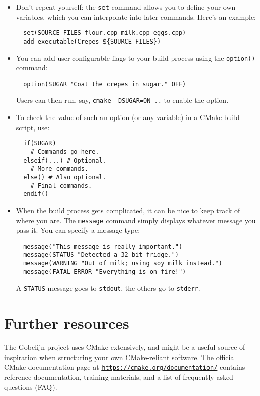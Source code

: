 \documentclass[12pt,a4paper]{article}
\newcommand{\cod}[1]{{\color{red!60!black}\texttt{#1}}}
\begin{document}
  \begin{itemize}
    \item Don't repeat yourself: the \cod{set} command allows you to define 
    your own variables, which you can interpolate into later commands. 
    Here's an example:
  \begin{lstlisting}
  set(SOURCE_FILES flour.cpp milk.cpp eggs.cpp)
  add_executable(Crepes ${SOURCE_FILES})
  \end{lstlisting}
    \item You can add user-configurable flags to your build process using the 
    \cod{option()} command:
  \begin{lstlisting}
  option(SUGAR "Coat the crepes in sugar." OFF)
  \end{lstlisting}
    Users can then run, say, \cod{cmake -DSUGAR=ON ..} to enable the option.
    
    \item To check the value of such an option (or any variable) in a CMake 
    build script, use:
  \begin{lstlisting}
  if(SUGAR)
    # Commands go here.
  elseif(...) # Optional.
    # More commands.
  else() # Also optional.
    # Final commands.
  endif()
  \end{lstlisting}
  \pagebreak
  
  \item When the build process gets complicated, it can be nice to keep track 
  of where you are. The \cod{message} command simply displays whatever message 
  you 
  pass it. You can specify a message type:
  \begin{lstlisting}
  message("This message is really important.")
  message(STATUS "Detected a 32-bit fridge.")
  message(WARNING "Out of milk; using soy milk instead.")
  message(FATAL_ERROR "Everything is on fire!")
  \end{lstlisting}
  A \cod{STATUS} message goes to \cod{stdout}, the others go to 
  \cod{stderr}.  
  \end{itemize}
  \section{Further resources}
  The Gobelijn project uses CMake extensively, and might be a useful source of 
  inspiration when structuring your own CMake-reliant software. The official 
  CMake documentation page at 
  \href{https://cmake.org/documentation/}{\cod{https://cmake.org/documentation/}}
  contains reference documentation, training materials, and a list of 
  frequently asked questions (FAQ).
\end{document}
